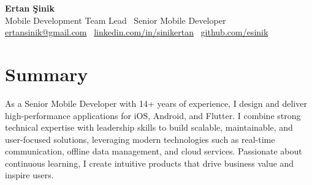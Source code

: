 \documentclass[11pt,a4paper]{extarticle}
\begin{document}
\begin{center}
    \begin{minipage}{\textwidth}
        \centering
        {\Huge\textbf{Ertan Şinik}}\\[4pt]
        {\large Mobile Development Team Lead \textbar\ Senior Mobile Developer}\\[10pt]
        \href{mailto:ertansinik@gmail.com}{ertansinik@gmail.com} \textbullet\
        \href{https://linkedin.com/in/sinikertan}{linkedin.com/in/sinikertan} \textbullet\
        \href{https://github.com/esinik}{github.com/esinik}
    \end{minipage}
\end{center}

\section{Summary}
As a Senior Mobile Developer with 14+ years of experience, I design and deliver high-performance applications for iOS, Android, and Flutter. I combine strong technical expertise with leadership skills to build scalable, maintainable, and user-focused solutions, leveraging modern technologies such as real-time communication, offline data management, and cloud services. Passionate about continuous learning, I create intuitive products that drive business value and inspire users.
\end{document}
